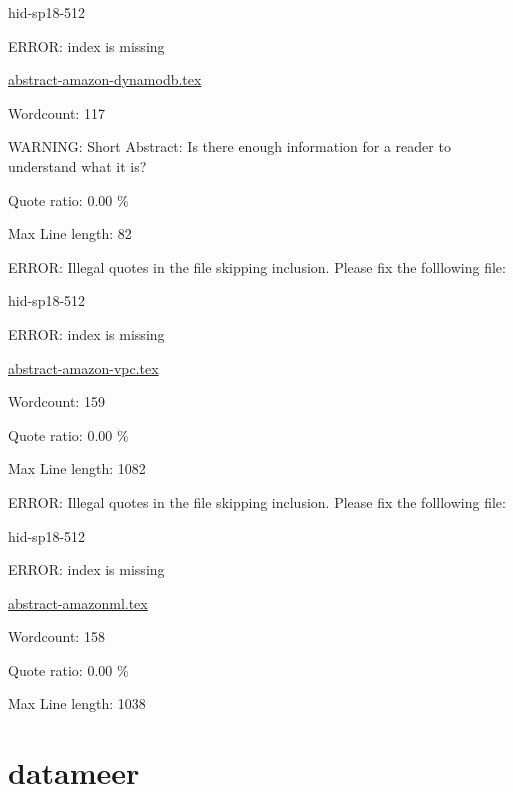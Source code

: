\begin{IU}

hid-sp18-512

ERROR: index is missing

\href{https://github.com/cloudmesh-community/hid-sp18-512/blob/master//technology/abstract-amazon-dynamodb.tex}{abstract-amazon-dynamodb.tex}

 

Wordcount: 117

WARNING: Short Abstract: Is there enough information for a reader to understand what it is?


Quote ratio: 0.00 \%
 
Max Line length: 82
\end{IU}

ERROR: Illegal quotes in the file skipping inclusion. Please fix the folllowing file:

\begin{IU}

hid-sp18-512

ERROR: index is missing

\href{https://github.com/cloudmesh-community/hid-sp18-512/blob/master//technology/abstract-amazon-vpc.tex}{abstract-amazon-vpc.tex}

 

Wordcount: 159


Quote ratio: 0.00 \%
 
Max Line length: 1082
\end{IU}

ERROR: Illegal quotes in the file skipping inclusion. Please fix the folllowing file:

\begin{IU}

hid-sp18-512

ERROR: index is missing

\href{https://github.com/cloudmesh-community/hid-sp18-512/blob/master//technology/abstract-amazonml.tex}{abstract-amazonml.tex}

 

Wordcount: 158


Quote ratio: 0.00 \%
 
Max Line length: 1038
\end{IU}

\section{datameer}

